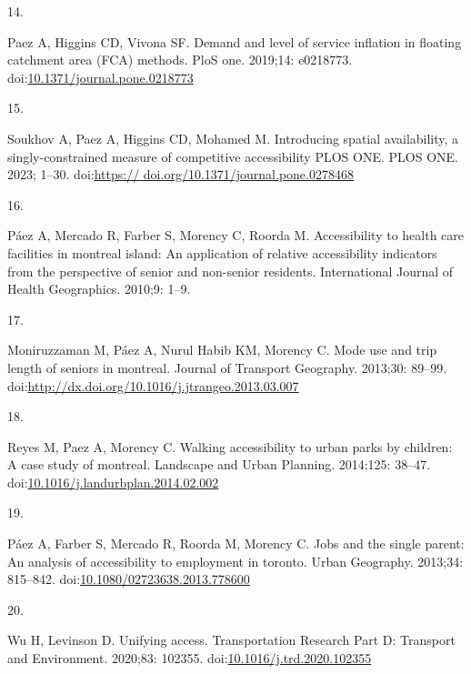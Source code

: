 \documentclass[10pt,letterpaper]{article}
\newlength{\cslhangindent}
\newlength{\csllabelwidth}
\newlength{\cslentryspacingunit} %
\newenvironment{CSLReferences}[2] %
 {%
  \setlength{\parindent}{0pt}
  \ifodd #1
  \let\oldpar\par
  \def\par{\hangindent=\cslhangindent\oldpar}
  \fi
  \setlength{\parskip}{#2\cslentryspacingunit}
 }%
 {}
\newcommand{\CSLLeftMargin}[1]{\parbox[t]{\csllabelwidth}{#1}}
\newcommand{\CSLRightInline}[1]{\parbox[t]{\linewidth - \csllabelwidth}{#1}\break}
\begin{document}
\begin{CSLReferences}{0}{0}
\leavevmode{}%
\CSLLeftMargin{14. }%
\CSLRightInline{Paez A, Higgins CD, Vivona SF. Demand and level of
service inflation in floating catchment area (FCA) methods. PloS one.
2019;14: e0218773.
doi:\href{https://doi.org/10.1371/journal.pone.0218773}{10.1371/journal.pone.0218773}}

\leavevmode{}%
\CSLLeftMargin{15. }%
\CSLRightInline{Soukhov A, Paez A, Higgins CD, Mohamed M. Introducing
spatial availability, a singly-constrained measure of competitive
accessibility \textbar{} {PLOS ONE}. PLOS ONE. 2023; 1--30.
doi:\href{https://\%20doi.org/10.1371/journal.pone.0278468}{https://
doi.org/10.1371/journal.pone.0278468}}

\leavevmode{}%
\CSLLeftMargin{16. }%
\CSLRightInline{Páez A, Mercado R, Farber S, Morency C, Roorda M.
Accessibility to health care facilities in montreal island: An
application of relative accessibility indicators from the perspective of
senior and non-senior residents. International Journal of Health
Geographics. 2010;9: 1--9. }

\leavevmode{}%
\CSLLeftMargin{17. }%
\CSLRightInline{Moniruzzaman M, Páez A, Nurul Habib KM, Morency C. Mode
use and trip length of seniors in montreal. Journal of Transport
Geography. 2013;30: 89--99.
doi:\url{http://dx.doi.org/10.1016/j.jtrangeo.2013.03.007}}

\leavevmode{}%
\CSLLeftMargin{18. }%
\CSLRightInline{Reyes M, Paez A, Morency C. Walking accessibility to
urban parks by children: A case study of montreal. Landscape and Urban
Planning. 2014;125: 38--47.
doi:\href{https://doi.org/10.1016/j.landurbplan.2014.02.002}{10.1016/j.landurbplan.2014.02.002}}

\leavevmode{}%
\CSLLeftMargin{19. }%
\CSLRightInline{Páez A, Farber S, Mercado R, Roorda M, Morency C. Jobs
and the single parent: An analysis of accessibility to employment in
toronto. Urban Geography. 2013;34: 815--842.
doi:\href{https://doi.org/10.1080/02723638.2013.778600}{10.1080/02723638.2013.778600}}

\leavevmode{}%
\CSLLeftMargin{20. }%
\CSLRightInline{Wu H, Levinson D. Unifying access. Transportation
Research Part D: Transport and Environment. 2020;83: 102355.
doi:\href{https://doi.org/10.1016/j.trd.2020.102355}{10.1016/j.trd.2020.102355}}


\end{CSLReferences}
\end{document}
